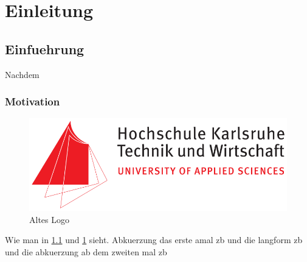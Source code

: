 \part{Einleitung}
\chapter{Einfuehrung}
\label{CH:1}
Nachdem
\section{Motivation}

\begin{figure}[t]
            \centering
		\includegraphics[width=1\textwidth]{images/logo/HsKa_old.jpg}
		\caption[Hka]{Altes Logo\cite{einstein}}
		\label{fig:structure}
\end{figure}
Wie man in \ref{fig:structure} und \ref{CH:1} sieht.
Abkuerzung das erste amal \ac{zb} und die langform \acl{zb} und die abkuerzung ab dem zweiten mal \ac{zb}